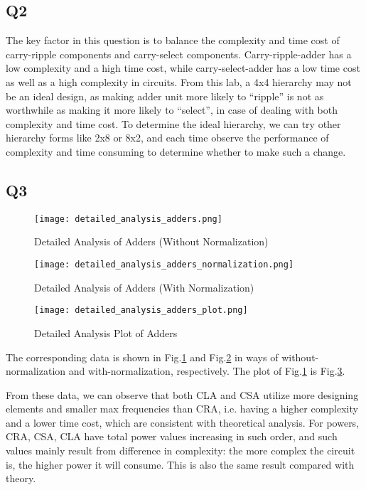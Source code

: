 \documentclass[11pt]{article}
\begin{document}
\subsection{Q2}
The key factor in this question is to balance the complexity and time cost of carry-ripple components and carry-select components. Carry-ripple-adder has a low complexity and a high time cost, while carry-select-adder has a low time cost as well as a high complexity in circuits. From this lab, a 4x4 hierarchy may not be an ideal design, as making adder unit more likely to “ripple” is not as worthwhile as making it more likely to “select”, in case of dealing with both complexity and time cost. To determine the ideal hierarchy, we can try other hierarchy forms like 2x8 or 8x2, and each time observe the performance of complexity and time consuming to determine whether to make such a change.

\subsection{Q3}
\begin{figure}[h]
    \centering
    \texttt{[image: detailed\_analysis\_adders.png]}
    \caption{Detailed Analysis of Adders (Without Normalization)}
    \label{without_normalization}
\end{figure}

\begin{figure}[h]
    \centering
    \texttt{[image: detailed\_analysis\_adders\_normalization.png]}
    \caption{Detailed Analysis of Adders (With Normalization)}
    \label{with_normalization}
\end{figure}

\begin{figure}[h]
    \centering
    \texttt{[image: detailed\_analysis\_adders\_plot.png]}
    \caption{Detailed Analysis Plot of Adders}
    \label{detailed_plot}
\end{figure}

The corresponding data is shown in Fig.\ref{without_normalization} and Fig.\ref{with_normalization} in ways of without-normalization and with-normalization, respectively. The plot of Fig.\ref{without_normalization} is Fig.\ref{detailed_plot}.

From these data, we can observe that both CLA and CSA utilize more designing elements and smaller max frequencies than CRA, i.e. having a higher complexity and a lower time cost, which are consistent with theoretical analysis. For powers, CRA, CSA, CLA have total power values increasing in such order, and such values mainly result from difference in complexity: the more complex the circuit is, the higher power it will consume. This is also the same result compared with theory.
\end{document}
